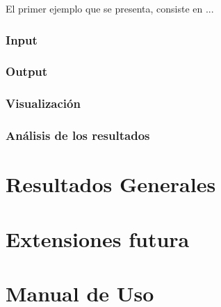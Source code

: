 El primer ejemplo que se presenta, consiste en ...


\subsubsection{Input}

\subsubsection{Output}

\subsubsection{Visualizaci\'on}

\subsubsection{An\'alisis de los resultados}
%  


\section{Resultados Generales}

\section{Extensiones futura}

\section{Manual de Uso}